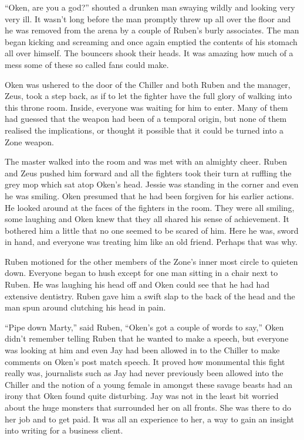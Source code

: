 ``Oken, are you a god?'' shouted a drunken man swaying wildly and looking very very ill.  It wasn't long before the man promptly threw up all over the floor and he was removed from the arena by a couple of Ruben's burly associates.  The man began kicking and screaming and once again emptied the contents of his stomach all over himself.  The bouncers shook their heads.  It was amazing how much of a mess some of these so called fans could make.

Oken was ushered to the door of the Chiller and both Ruben and the manager, Zeus, took a step back, as if to let the fighter have the full glory of walking into this throne room.  Inside, everyone was waiting for him to enter.  Many of them had guessed that the weapon had been of a temporal origin, but none of them realised the implications, or thought it possible that it could be turned into a Zone weapon.

The master walked into the room and was met with an almighty cheer.  Ruben and Zeus pushed him forward and all the fighters took their turn at ruffling the grey mop which sat atop Oken's head.  Jessie was standing in the corner and even he was smiling.  Oken presumed that he had been forgiven for his earlier actions.  He looked around at the faces of the fighters in the room.  They were all smiling, some laughing and Oken knew that they all shared his sense of achievement.   It bothered him a little that no one seemed to be scared of him.  Here he was, sword in hand, and everyone was treating him like an old friend.  Perhaps that was why.

Ruben motioned for the other members of the Zone's inner most circle to quieten down.  Everyone began to hush except for one man sitting in a chair next to Ruben.  He was laughing his head off and Oken could see that he had had extensive dentistry.  Ruben gave him a swift slap to the back of the head and the man spun around clutching his head in pain.  

``Pipe down Marty,'' said Ruben, ``Oken's got a couple of words to say,''  Oken didn't remember telling Ruben that he wanted to make a speech, but everyone was looking at him and even Jay had been allowed in to the Chiller to make comments on Oken's post match speech.  It proved how monumental this fight really was, journalists such as Jay had never previously been allowed into the Chiller and the notion of a young female in amongst these savage beasts had an irony that Oken found quite disturbing.  Jay was not in the least bit worried about the huge monsters that surrounded her on all fronts.  She was there to do her job and to get paid.  It was all an experience to her, a way to gain an insight into writing for a business client.

